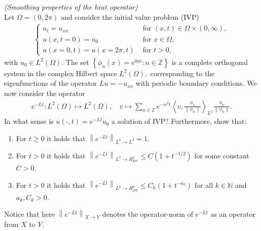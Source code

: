
\begin{exercise}
\textit{(Smoothing properties of the heat operator)} \\
Let $\Omega=(0,2 \pi)$ and consider the initial value problem (IVP)
\begin{align*}
  \left\{\begin{array}{ll}
  u_{t}=u_{x x} & \text { for } (x, t) \in \Omega \times(0, \infty), \\
  u(x, t=0)=u_{0} & \text { for } x \in \Omega, \\
  u(x=0, t)=u(x=2 \pi, t) & \text { for } t>0,
  \end{array}\right.
\end{align*}
with $u_{0} \in L^{2}(\Omega) .$ The set $\left\{\phi_{n}(x)=e^{\mathrm{in} x}: n \in \mathbb{Z}\right\}$ is a complete orthogonal system in the complex Hilbert space $L^{2}(\Omega),$ corresponding to the eigenfunctions of the operator $L u=-u_{x x}$ with periodic boundary conditions. We now consider the operator
\begin{align*}
  e^{-L t}: L^{2}(\Omega) \mapsto L^{2}(\Omega), \quad
  v \mapsto \sum_{n \in \mathbb{Z}} e^{-n^{2} t}\left\langle v,
  \frac{\phi_{n}}{\left\|\phi_{n}\right\|}\right\rangle_{L^{2}}
  \frac{\phi_{n}}{\left\|\phi_{n}\right\|}.
\end{align*}
In what sense is $u(\cdot, t)=e^{-L t} u_{0}$ a solution of IVP? Furthermore, show that:
\begin{enumerate}[label = (\roman*)]
  \item For $t \geq 0$ it holds that $\left\|e^{-L t}\right\|_{L^{2} \rightarrow L^{2}}=1$.
  \item For $t>0$ it holds that
  $\left\|e^{-L t}\right\|_{L^{2} \rightarrow H_{p e r}^{1}} \leq C\left(1+t^{-1 / 2}\right)$
  for some constant $C>0$.
  \item For $t>0$ it holds that $\left\|e^{-L t}\right\|_{L^{2} \rightarrow H_{\text {per}}^{k}} \leq C_{k}\left(1+t^{-a_{k}}\right)$ for all $k \in \mathbb{N}$ and $a_{k}, C_{k}>0$.
\end{enumerate}
Notice that here $\left\|e^{-L t}\right\|_{X \rightarrow Y}$ denotes the operator-norm of $e^{-L t}$ as an operator from $X$ to $Y$.
\end{exercise}


